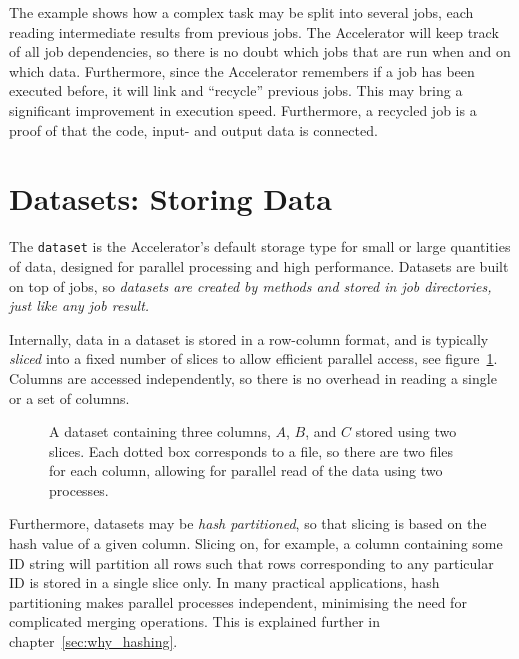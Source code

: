 The example shows how a complex task may be split into several jobs,
each reading intermediate results from previous jobs.  The Accelerator
will keep track of all job dependencies, so there is no doubt which
jobs that are run when and on which data.  Furthermore, since the
Accelerator remembers if a job has been executed before, it will link
and ``recycle'' previous jobs.  This may bring a significant
improvement in execution speed.  Furthermore, a recycled job is a
proof of that the code, input- and output data is connected.


\section{Datasets: Storing Data}

The \texttt{dataset} is the Accelerator's default storage type for
small or large quantities of data, designed for parallel processing
and high performance.  Datasets are built on top of jobs, so
\emph{datasets are created by methods and stored in job directories,
  just like any job result.}

Internally, data in a dataset is stored in a row-column format, and is
typically \emph{sliced} into a fixed number of slices to allow
efficient parallel access, see figure~\ref{fig:dataset}. Columns are
accessed independently, so there is no overhead in reading a single or
a set of columns.


\begin{figure}[h!]
  \begin{center}
    
    \caption{A dataset containing three columns, $A$, $B$, and $C$
      stored using two slices.  Each dotted box corresponds to a file,
      so there are two files for each column, allowing for parallel
      read of the data using two processes.}
    \label{fig:dataset}
  \end{center}
\end{figure}

Furthermore, datasets may be \textsl{hash partitioned}, so that
slicing is based on the hash value of a given column.  Slicing on, for
example, a column containing some ID string will partition all rows
such that rows corresponding to any particular ID is stored in a
single slice only.  In many practical applications, hash partitioning
makes parallel processes independent, minimising the need for
complicated merging operations.  This is explained further in
chapter~\ref{sec:why_hashing}.



